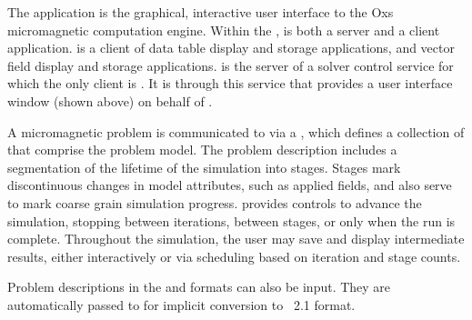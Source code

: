 \begin{center}
\end{center}

The application  is the graphical, interactive user interface
to the Oxs micromagnetic computation engine.  Within the
,  is both a server and a client
application.  is a client of data table display and storage
applications, and vector field display and storage applications.
 is the server of a solver control service for which the only
client is .  It is through
this service that  provides a user interface window (shown
above) on behalf of .

A micromagnetic problem is communicated to  via a
,
which defines a collection of 
that comprise the problem model.  The problem description includes a
segmentation of the lifetime of the simulation into stages.  Stages mark
discontinuous changes in model attributes, such as applied fields, and
also serve to mark coarse grain simulation progress.  
provides controls to advance the simulation, stopping between
iterations, between stages, or only when the run is complete.
Throughout the simulation, the user may save and display intermediate
results, either interactively or via scheduling based on iteration and
stage counts.

Problem descriptions in the  and
 formats can also be input.  They are
automatically passed to  for implicit conversion to \MIF~2.1 format.

